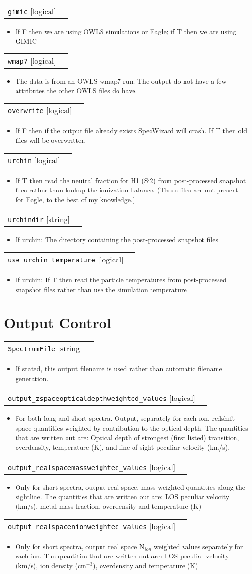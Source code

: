 \documentclass{report}
\makeatletter
\newcommand{\paramdefinition}[3]{
\begin{tabular*}{\textwidth}{l@{\extracolsep{\fill}}r}
		{\tt #1} [{\sc #2}]& #3 \\
\end{tabular*}}
\newcommand{\paramdescription}[1]{
\begin{itemize}
\item #1
\end{itemize}\vspace{0.2cm}}
\makeatother
\begin{document}
\paramdefinition{gimic}{logical}{}
\paramdescription{If F then we are using OWLS simulations or Eagle; if T then we are using GIMIC}

\paramdefinition{wmap7}{logical}{}
\paramdescription{The data is from an OWLS wmap7 run. The output do not have a few attributes the other OWLS files do have.}

\paramdefinition{overwrite}{logical}{}
\paramdescription{If F then if the output file already exists SpecWizard will crash.  If T then old files will be overwritten}

\paramdefinition{urchin}{logical}{}
\paramdescription{If T then read the neutral fraction for H1 (Si2) from post-processed snapshot files rather than lookup the ionization balance. (Those files are not present for Eagle, to the best of my knowledge.)}

\paramdefinition{urchindir}{string}{}
\paramdescription{If urchin: The directory containing the post-processed snapshot files}

\paramdefinition{use\_urchin\_temperature}{logical}{}
\paramdescription{If urchin: If T then read the particle temperatures from post-processed snapshot files rather than use the simulation temperature}



\section{Output Control}

\paramdefinition{SpectrumFile}{string}{}
\paramdescription{If stated, this output filename is used rather than automatic filename generation.}

\paramdefinition{output\_zspaceopticaldepthweighted\_values}{logical}{ }
\paramdescription{For both long and short spectra. Output, separately for each ion, redshift space quantities weighted by contribution to the optical depth. The quantities that are written out are:  Optical depth of strongest (first listed) transition, overdensity, temperature (K), and line-of-sight peculiar velocity (km/s).}

\paramdefinition{output\_realspacemassweighted\_values}{logical}{ }
\paramdescription{Only for short spectra, output real space, mass weighted quantities along the sightline.  The quantities that are written out are: LOS peculiar velocity (km/s), metal mass fraction, overdensity and temperature (K)}

\paramdefinition{output\_realspacenionweighted\_values}{logical}{ }
\paramdescription{Only for short spectra, output real space N$_{ion}$ weighted values separately for each ion.  The quantities that are written out are: LOS peculiar velocity (km/s), ion density (cm$^{-3}$), overdensity and temperature (K)}
\end{document}
